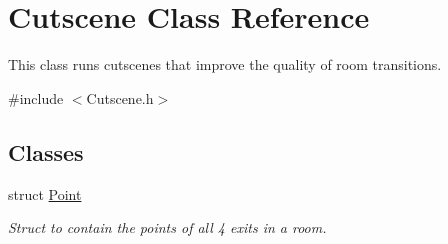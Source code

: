 \hypertarget{classCutscene}{\section{Cutscene Class Reference}
\label{classCutscene}
}


This class runs cutscenes that improve the quality of room transitions.  




{\ttfamily \#include $<$Cutscene.\-h$>$}

\subsection*{Classes}
\begin{DoxyCompactItemize}
\item 
struct \hyperlink{structCutscene_1_1Point}{Point}
\begin{DoxyCompactList}\small\item\em Struct to contain the points of all 4 exits in a room. \end{DoxyCompactList}\end{DoxyCompactItemize}
